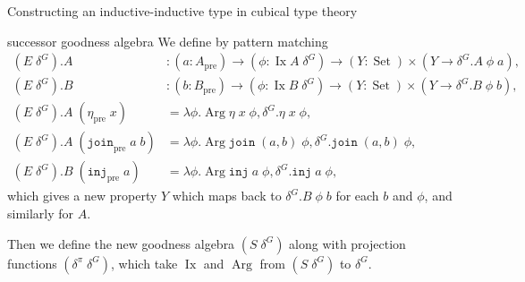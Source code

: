 \documentclass[acmsmall,review]{acmart}\settopmatter{printfolios=true,printccs=false,printacmref=false}
\DeclareMathOperator{\USet}{Set}
\DeclareMathOperator{\Arg}{Arg}
\DeclareMathOperator{\Ix}{Ix}
\newcommand{\pre}[1]{{#1}_\text{pre}}
\newcommand{\join}{\texttt{join}}
\newcommand{\inj}{\texttt{inj}}
\begin{document}
\begin{section}{Constructing an inductive-inductive type in cubical type theory}
\begin{subsection}{successor goodness algebra}
We define by pattern matching \begin{align*}
(E\;\delta^G).A &: (a : \pre{A}) \to (\phi : \Ix A\;\delta^G) \to (Y : \USet) \times (Y \to \delta^G.A\;\phi\;a),\\
(E\;\delta^G).B &: (b : \pre{B}) \to (\phi : \Ix B\;\delta^G) \to (Y : \USet) \times (Y \to \delta^G.B\;\phi\;b),\\
(E\;\delta^G).A\;(\pre{\eta}\;x) &= \lambda \phi. \Arg\eta\;x\;\phi, \delta^G.\eta\;x\;\phi,\\
(E\;\delta^G).A\;(\pre{\join}\;a\;b) &= \lambda \phi. \Arg\join\;(a, b)\;\phi, \delta^G.\join\;(a, b)\;\phi,\\
(E\;\delta^G).B\;(\pre{\inj}\;a) &= \lambda \phi. \Arg\inj\;a\;\phi, \delta^G.\inj\;a\;\phi,
\end{align*}
which gives a new property $Y$ which maps back to $\delta^G.B\;\phi\;b$ for each $b$ and $\phi$, and similarly for $A$.

Then we define the new goodness algebra $(S\;\delta^G)$ along with projection functions $(\delta^\pi\;\delta^G)$, which take $\Ix$ and $\Arg$ from $(S\;\delta^G)$ to $\delta^G$.


\end{subsection}
\end{section}
\end{document}
